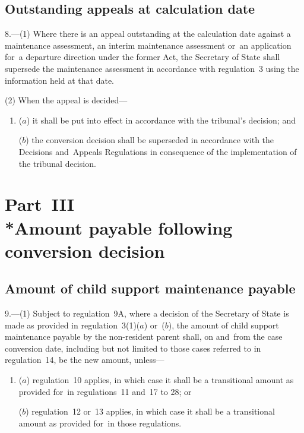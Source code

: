 \documentclass[12pt,a4paper]{article}
\begin{document}

\subsection[8. Outstanding appeals at calculation date]{Outstanding appeals at calculation date}

8.---(1)  Where there is an appeal outstanding at the calculation date against a maintenance assessment, an interim maintenance assessment or~an application for~a departure direction under the former Act, the Secretary of State shall supersede the maintenance assessment in accordance with regulation~3 using the information held at that date.

(2) When the appeal is decided—
\begin{enumerate}\item[]
($a$) it shall be put into effect in accordance with the tribunal’s decision; and

($b$) the conversion decision shall be superseded in accordance with the Decisions and~Appeals Regulations in consequence of the implementation of the tribunal decision.
\end{enumerate}

\section[Part~III --- Amount payable following conversion decision]{Part~III\\*Amount payable following conversion decision}

\renewcommand\parthead{--- Part~III}

\subsection[9. Amount of child support maintenance payable]{Amount of child support maintenance payable}

9.---(1)  
Subject to regulation~9A, where  %
a decision of the Secretary of State is made as provided in regulation~3(1)($a$)  or~($b$), the amount of child support maintenance payable by the non-resident parent shall, on and~from the case conversion date, including but not limited to those cases referred to in regulation~14, be the new amount, 
unless—
\begin{enumerate}\item[]
    ($a$) 
    regulation~10 applies, in which case it shall be a transitional amount as provided for~in regulations~11 and~17 to 28; or

    ($b$) 
    regulation~12 or~13 applies, in which case it shall be a transitional amount as provided for~in those regulations.
\end{enumerate}  %
\end{document}
